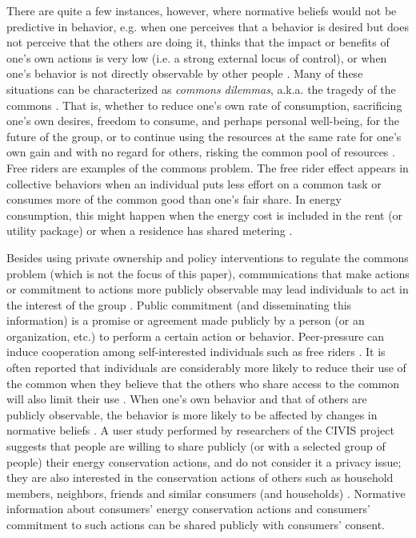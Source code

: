 \documentclass[a4paper]{article}
\begin{document}
There are quite a few instances, however, where normative beliefs would not be predictive in behavior, e.g. when one perceives that a behavior is desired but does not perceive that the others are doing it, thinks that the impact or benefits of one's own actions is very low (i.e. a strong external locus of control), or when one's behavior is not directly observable by other people \citep{Schultz2002,ockwell2009reorienting}. Many of these situations can be characterized as \textit{commons dilemmas}, a.k.a. the tragedy of the commons \citep{Hardin1968,Schultz2002}. That is, whether to reduce one's own rate of consumption, sacrificing one's own desires, freedom to consume, and perhaps personal well-being, for the future of the group, or to continue using the resources at the same rate for one's own gain and with no regard for others, risking the common pool of resources \citep{Edney1978,Edney1980}. Free riders are examples of the commons problem. The free rider effect appears in collective behaviors \citep{isaac1984divergent,andreoni1988free,feldman2005overcoming} when an individual puts less effort on a common task or consumes more of the common good than one's fair share. In energy consumption, this might happen when the energy cost is included in the rent (or utility package) \citep{munley1990electricity} or when a residence has shared metering \citep{dewees2011impact}.

Besides using private ownership and policy interventions to regulate the commons problem (which is not the focus of this paper), communications that make actions or commitment to actions more publicly observable may lead individuals to act in the interest of the group \citep{Edney1978,Schultz2002}. Public commitment (and disseminating this information) \citep{mckenzie2000fostering,Abrahamse2005} is a promise or agreement made publicly by a person (or an organization, etc.) to perform a certain action or behavior. Peer-pressure can induce cooperation among self-interested individuals such as free riders \citep{mani2013inducing}. It is often reported that individuals are considerably more likely to reduce their use of the common when they believe that the others who share access to the common will also limit their use \citep{Edney1978,Schultz2002}. When one's own behavior and that of others are publicly observable, the behavior is more likely to be affected by changes in normative beliefs \citep{yim2011tale,Schultz2002}. A user study performed by researchers of the CIVIS project suggests that people are willing to share publicly (or with a selected group of people) their energy conservation actions, and do not consider it a privacy issue; they are also interested in the conservation actions of others such as household members, neighbors, friends and similar consumers (and households) \citep{Barssi2015}. Normative information about consumers' energy conservation actions and consumers' commitment to such actions can be shared publicly with consumers' consent.
\end{document}
